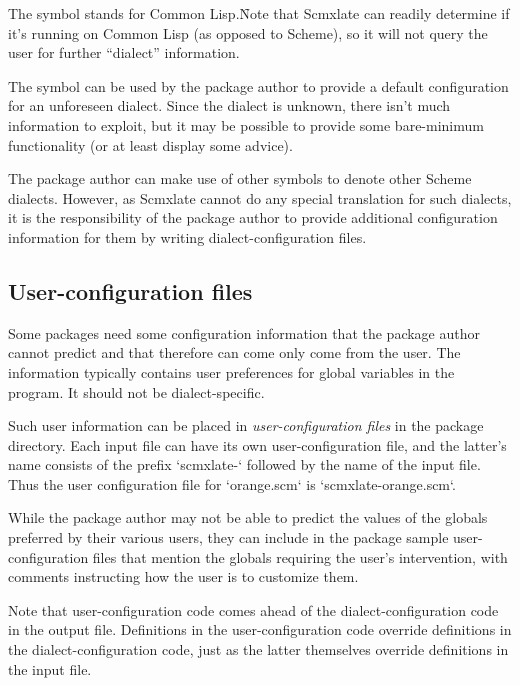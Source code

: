 
The symbol  stands for
Common Lisp.\f{Note that
Scmxlate can readily determine if it’s running
on Common Lisp (as opposed to Scheme), so it will not query the user
for further “dialect” information.}

The symbol  can be used by the package author
to provide a default configuration for an unforeseen
dialect.  Since the dialect is unknown, there isn’t
much information to exploit, but it may be
possible to provide some bare-minimum functionality
(or at least display some advice).

The package author can make use of other symbols to
denote other Scheme dialects.  However, as Scmxlate
cannot do any special translation for such dialects, it
is the responsibility of the package author to provide
additional configuration information for them by
writing dialect-configuration files.

\subsection{User-configuration files}

Some packages need some configuration information that
the package author cannot predict and that therefore
can come only come from the user.  The information
typically contains user preferences for global
variables in the program.  It should not be
dialect-specific.

Such user information can be placed in {\em
user-configuration files} in the package directory.
Each input file can have its own
user-configuration file, and the latter’s name
consists of the prefix `scmxlate-` followed by the
name of the input file.  Thus the user configuration
file for `orange.scm` is `scmxlate-orange.scm`.

While the package author may not be able to predict the
values of the globals preferred by their various
users, they can include in the package sample
user-configuration files that mention the globals
requiring the user’s intervention, with comments
instructing how the user is to customize them.

Note that user-configuration code comes ahead of the
dialect-configuration code in the output file.
Definitions in the user-configuration code override
definitions in the dialect-configuration code, just
as the latter themselves override definitions in the
input file.

